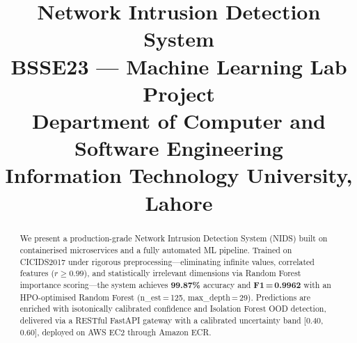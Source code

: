 \documentclass[9pt,conference]{IEEEtran}
\begin{document}
\enlargethispage{3.2in}

\title{%
\textbf{Network Intrusion Detection System}\\
\large\normalfont BSSE23 --- Machine Learning Lab Project\\Department of Computer and Software Engineering\\Information Technology University, Lahore}

\author{%
}
\maketitle

\begin{abstract}
We present a production-grade Network Intrusion Detection System (NIDS) built on containerised microservices and a fully automated ML pipeline.
Trained on CICIDS2017 under rigorous preprocessing---eliminating infinite values, correlated features ($r\!\ge\!0.99$), and statistically irrelevant dimensions via Random Forest importance scoring---the system achieves \textbf{99.87\%} accuracy and \textbf{F1\,=\,0.9962} with an HPO-optimised Random Forest (n\_est\,=\,125, max\_depth\,=\,29). Predictions are enriched with isotonically calibrated confidence and Isolation Forest OOD detection, delivered via a RESTful FastAPI gateway with a calibrated uncertainty band [0.40,\,0.60], deployed on AWS EC2 through Amazon ECR.
\end{abstract}

\end{document}

